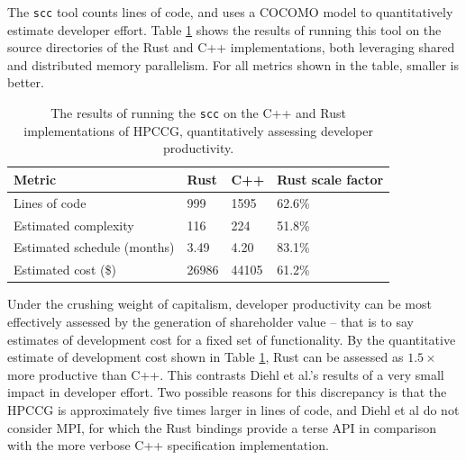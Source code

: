 The \texttt{scc} tool counts lines of code, and uses a COCOMO model to quantitatively estimate developer effort. Table \ref{tab:scc-language-comparison} shows the results of running this tool on the source directories of the Rust and C++ implementations, both leveraging shared and distributed memory parallelism. For all metrics shown in the table, smaller is better.

\begin{table}[H]
    \centering
    \caption{The results of running the \texttt{scc} on the C++ and Rust implementations of HPCCG, quantitatively assessing developer productivity.}
    \label{tab:scc-language-comparison}
    \begin{tabular}{|l||l|l|l|}
    \hline
    \textbf{Metric}             & \textbf{Rust} & \textbf{C++} & \textbf{Rust scale factor} \\ \hline\hline
    Lines of code               & 999           & 1595         & 62.6\%                     \\ \hline
    Estimated complexity        & 116           & 224          & 51.8\%                     \\ \hline
    Estimated schedule (months) & 3.49          & 4.20         & 83.1\%                     \\ \hline
    Estimated cost (\$)         & 26986         & 44105        & 61.2\%                     \\ \hline
    \end{tabular}
\end{table}


Under the crushing weight of capitalism, developer productivity can be most effectively assessed by the generation of shareholder value -- that is to say estimates of development cost for a fixed set of functionality. By the quantitative estimate of development cost shown in Table \ref{tab:scc-language-comparison}, Rust can be assessed as $1.5 \times$ more productive than C++. This contrasts Diehl et al.'s results of a very small impact in developer effort. Two possible reasons for this discrepancy is that the HPCCG is approximately five times larger in lines of code, and Diehl et al do not consider MPI, for which the Rust bindings provide a terse API in comparison with the more verbose C++ specification implementation.

